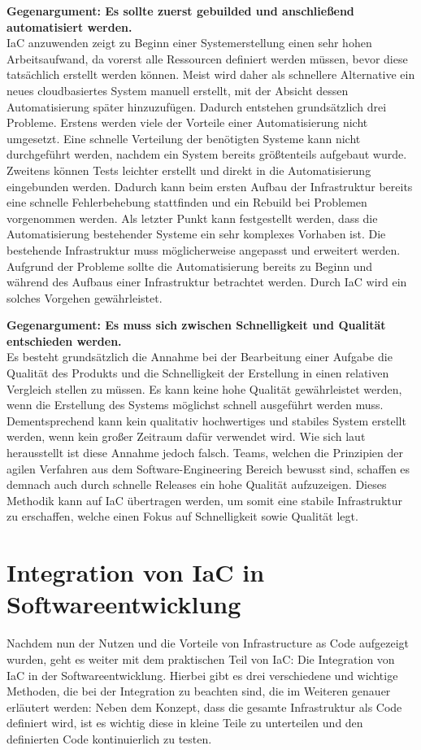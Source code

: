 \documentclass[biblatex]{lni}
\begin{document}
\textbf{Gegenargument: Es sollte zuerst gebuilded und anschließend automatisiert werden.}\\
IaC anzuwenden zeigt zu Beginn einer Systemerstellung einen sehr hohen Arbeitsaufwand, da vorerst alle Ressourcen definiert werden müssen, bevor diese tatsächlich erstellt werden können. Meist wird daher als schnellere Alternative ein neues cloudbasiertes System manuell erstellt, mit der Absicht dessen Automatisierung später hinzuzufügen. Dadurch entstehen grundsätzlich drei Probleme. Erstens werden viele der Vorteile einer Automatisierung nicht umgesetzt. Eine schnelle Verteilung der benötigten Systeme kann nicht durchgeführt werden, nachdem ein System bereits größtenteils aufgebaut wurde. Zweitens können Tests leichter erstellt und direkt in die Automatisierung eingebunden werden. Dadurch kann beim ersten Aufbau der Infrastruktur bereits eine schnelle Fehlerbehebung stattfinden und ein Rebuild bei Problemen vorgenommen werden. Als letzter Punkt kann festgestellt werden, dass die Automatisierung bestehender Systeme ein sehr komplexes Vorhaben ist. Die bestehende Infrastruktur muss möglicherweise angepasst und erweitert werden. Aufgrund der Probleme sollte die Automatisierung bereits zu Beginn und während des Aufbaus einer Infrastruktur betrachtet werden. Durch IaC wird ein solches Vorgehen gewährleistet.

\textbf{Gegenargument: Es muss sich zwischen Schnelligkeit und Qualität entschieden werden.}\\
Es besteht grundsätzlich die Annahme bei der Bearbeitung einer Aufgabe die Qualität des Produkts und die Schnelligkeit der Erstellung in einen relativen Vergleich stellen zu müssen. Es kann keine hohe Qualität gewährleistet werden, wenn die Erstellung des Systems möglichst schnell ausgeführt werden muss. Dementsprechend kann kein qualitativ hochwertiges und stabiles System erstellt werden, wenn kein großer Zeitraum dafür verwendet wird. Wie sich laut \cite{Humble.2018} herausstellt ist diese Annahme jedoch falsch. Teams, welchen die Prinzipien der agilen Verfahren aus dem Software-Engineering Bereich bewusst sind, schaffen es demnach auch durch schnelle Releases ein hohe Qualität aufzuzeigen. Dieses Methodik kann auf IaC übertragen werden, um somit eine stabile Infrastruktur zu erschaffen, welche einen Fokus auf Schnelligkeit sowie Qualität legt. %

\section{Integration von IaC in Softwareentwicklung}
Nachdem nun der Nutzen und die Vorteile von Infrastructure as Code aufgezeigt wurden, geht es weiter mit dem praktischen Teil von IaC: Die Integration von IaC in der Softwareentwicklung. Hierbei gibt es drei verschiedene und wichtige Methoden, die bei der Integration zu beachten sind, die im Weiteren genauer erläutert werden: Neben dem Konzept, dass die gesamte Infrastruktur als Code definiert wird, ist es wichtig diese in kleine Teile zu unterteilen und den definierten Code kontinuierlich zu testen.
\end{document}
